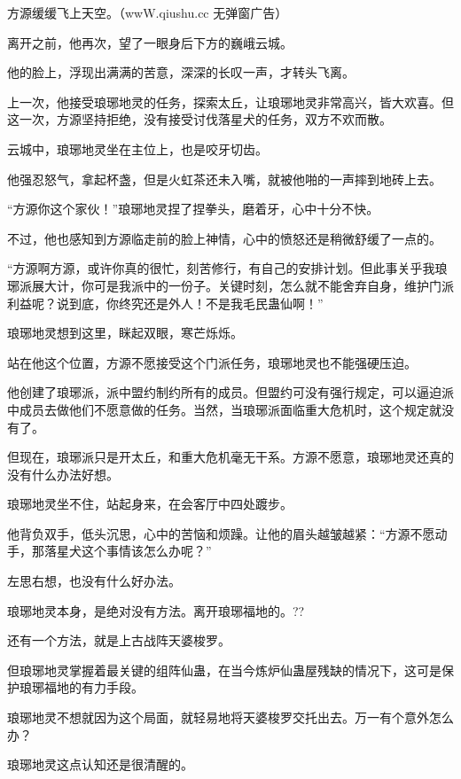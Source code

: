
\begin{this_body}

方源缓缓飞上天空。（wwW.qiushu.cc 无弹窗广告）

离开之前，他再次，望了一眼身后下方的巍峨云城。

他的脸上，浮现出满满的苦意，深深的长叹一声，才转头飞离。

上一次，他接受琅琊地灵的任务，探索太丘，让琅琊地灵非常高兴，皆大欢喜。但这一次，方源坚持拒绝，没有接受讨伐落星犬的任务，双方不欢而散。

云城中，琅琊地灵坐在主位上，也是咬牙切齿。

他强忍怒气，拿起杯盏，但是火虹茶还未入嘴，就被他啪的一声摔到地砖上去。

“方源你这个家伙！”琅琊地灵捏了捏拳头，磨着牙，心中十分不快。

不过，他也感知到方源临走前的脸上神情，心中的愤怒还是稍微舒缓了一点的。

“方源啊方源，或许你真的很忙，刻苦修行，有自己的安排计划。但此事关乎我琅琊派展大计，你可是我派中的一份子。关键时刻，怎么就不能舍弃自身，维护门派利益呢？说到底，你终究还是外人！不是我毛民蛊仙啊！”

琅琊地灵想到这里，眯起双眼，寒芒烁烁。

站在他这个位置，方源不愿接受这个门派任务，琅琊地灵也不能强硬压迫。

他创建了琅琊派，派中盟约制约所有的成员。但盟约可没有强行规定，可以逼迫派中成员去做他们不愿意做的任务。当然，当琅琊派面临重大危机时，这个规定就没有了。

但现在，琅琊派只是开太丘，和重大危机毫无干系。方源不愿意，琅琊地灵还真的没有什么办法好想。

琅琊地灵坐不住，站起身来，在会客厅中四处踱步。

他背负双手，低头沉思，心中的苦恼和烦躁。让他的眉头越皱越紧：“方源不愿动手，那落星犬这个事情该怎么办呢？”

左思右想，也没有什么好办法。

琅琊地灵本身，是绝对没有方法。离开琅琊福地的。??

还有一个方法，就是上古战阵天婆梭罗。

但琅琊地灵掌握着最关键的组阵仙蛊，在当今炼炉仙蛊屋残缺的情况下，这可是保护琅琊福地的有力手段。

琅琊地灵不想就因为这个局面，就轻易地将天婆梭罗交托出去。万一有个意外怎么办？

琅琊地灵这点认知还是很清醒的。


\end{this_body}
